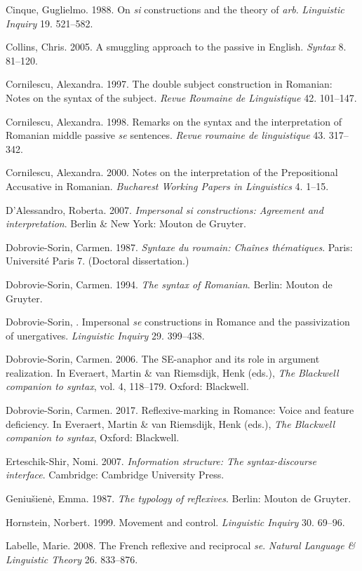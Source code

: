 \documentclass[output=paper]{langsci/langscibook}
\begin{document}
Cinque, Guglielmo. 1988. On \textit{si} constructions and the theory of \textit{arb}. \textit{Linguistic Inquiry} 19. 521–582.

Collins, Chris. 2005. A smuggling approach to the passive in English. \textit{Syntax} 8. 81–120.

Cornilescu, Alexandra. 1997. The double subject construction in Romanian: Notes on the syntax of the subject. \textit{Revue Roumaine de Linguistique} 42. 101–147.

Cornilescu, Alexandra. 1998. Remarks on the syntax and the interpretation of Romanian middle passive \textit{se} sentences. \textit{Revue roumaine de linguistique} 43. 317–342.

Cornilescu, Alexandra. 2000. Notes on the interpretation of the Prepositional Accusative in Romanian. \textit{Bucharest Working Papers in Linguistics} 4. 1–15.

D’Alessandro, Roberta. 2007. \textit{Impersonal si constructions: Agreement and interpretation}. Berlin \& New York: Mouton de Gruyter.

Dobrovie-Sorin, Carmen. 1987. \textit{Syntaxe du roumain: Chaînes thématiques}. Paris: Université Paris 7. (Doctoral dissertation.)

Dobrovie-Sorin, Carmen. 1994. \textit{The syntax of Romanian}. Berlin: Mouton de Gruyter.

Dobrovie-Sorin, \citealt{Carmen1998}. Impersonal \textit{se} constructions in Romance and the passivization of unergatives. \textit{Linguistic Inquiry} 29. 399–438.

Dobrovie-Sorin, Carmen. 2006. The SE-anaphor and its role in argument realization. In Everaert, Martin \& van Riemsdijk, Henk (eds.), \textit{The Blackwell companion to syntax}, vol. 4, 118–179. Oxford: Blackwell.

Dobrovie-Sorin, Carmen. 2017. Reflexive-marking in Romance: Voice and feature deficiency. In Everaert, Martin \& van Riemsdijk, Henk (eds.), \textit{The Blackwell companion to syntax}, Oxford: Blackwell.

Erteschik-Shir, Nomi. 2007. \textit{Information structure: The syntax-discourse interface}. Cambridge: Cambridge University Press.

Geniušien\.e, Emma. 1987. \textit{The typology of reflexives}. Berlin: Mouton de Gruyter.

Hornstein, Norbert. 1999. Movement and control. \textit{Linguistic Inquiry} 30. 69–96.

Labelle, Marie. 2008. The French reflexive and reciprocal \textit{se}. \textit{Natural Language \& Linguistic Theory} 26. 833–876.
\end{document}
